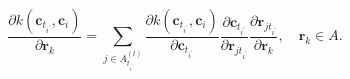 \begin{equation}
\label{eq:kernel_position_gradient}
  \frac{\partial k(\mathbf{c}_{t_{i^\prime}}, \mathbf{c}_{i})}{\partial\mathbf{r}_{k}} = 
  \sum_{j\in A^{(t)}_{t_{i^\prime}}}\frac{\partial k(\mathbf{c}_{t_{i^\prime}}, \mathbf{c}_{i})}{\partial\mathbf{c}_{t_{i^\prime}}}\frac{\partial\mathbf{c}_{t_{i^\prime}}}{\partial\mathbf{r}_{jt_{i^\prime}}}\frac{\partial\mathbf{r}_{jt_{i^\prime}}}{\partial\mathbf{r}_{k}},\quad\mathbf{r}_k\in A.
\end{equation}
